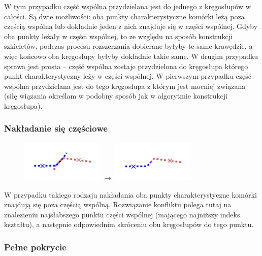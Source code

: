 \documentclass[declaration,shortabstract,mgr]{iithesis}
\begin{document}
W tym przypadku część wspólna przydzielana jest do jednego z kręgosłupów w całości.
Są dwie możliwości: oba punkty charakterystyczne komórki leżą poza częścią wspólną lub dokładnie jeden z nich znajduje się w części wspólnej.
Gdyby oba punkty leżały w części wspólnej, to ze względu na sposób konstrukcji szkieletów, podczas procesu rozszerzania dobierane byłyby te same krawędzie, a więc końcowo oba kręgosłupy byłyby dokładnie takie same.
W drugim przypadku sprawa jest prosta -- część wspólna zostaje przydzielona do kręgosłupa którego punkt charakterystyczny leży w części wspólnej. W pierwszym przypadku część wspólna przydzielana jest do tego kręgosłupa z którym jest mocniej związana (siłę wiązania określam w podobny sposób jak w algorytmie konstrukcji kręgosłupa).

\subsubsection{Nakładanie się częściowe}

\begin{figure}[h]
  \centering
  \includegraphics[valign=m,width=0.35\textwidth]{images/overlap-p.png}
  $\rightarrow$
  \includegraphics[valign=m,width=0.35\textwidth]{images/overlap-p-solved.png}
\end{figure}

W przypadku takiego rodzaju nakładania oba punkty charakterystyczne komórki znajdują się poza częścią wspólną.
Rozwiązanie konfliktu polega tutaj na znalezieniu najsłabszego punktu części wspólnej (mającego najniższy indeks kształtu), a następnie odpowiednim skróceniu obu kręgosłupów do tego punktu.

\subsubsection{Pełne pokrycie}
\end{document}
